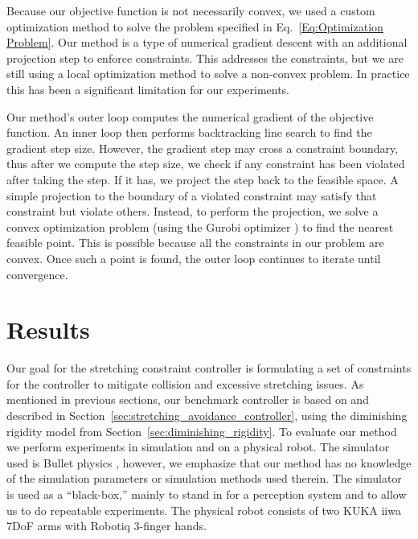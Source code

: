 Because our objective function is not necessarily convex, we used a custom optimization method to solve the problem specified in Eq.~\ref{Eq:Optimization Problem}. Our method is a type of numerical gradient descent with an additional projection step to enforce constraints. This addresses the constraints, but we are still using a local optimization method to solve a non-convex problem. In practice this has been a significant limitation for our experiments.

Our method's outer loop computes the numerical gradient of the objective function. An inner loop then performs backtracking line search to find the gradient step size. However, the gradient step may cross a constraint boundary, thus after we compute the step size, we check if any constraint has been violated after taking the step. If it has, we project the step back to the feasible space. A simple projection to the boundary of a violated constraint may satisfy that constraint but violate others. Instead, to perform the projection, we solve a convex optimization problem (using the Gurobi optimizer \cite{Gurobi2016}) to find the nearest feasible point. This is possible because all the constraints in our problem are convex. Once such a point is found, the outer loop continues to iterate until convergence.


\section{Results}
\label{sec:stretching_constraint_controller_results}

Our goal for the stretching constraint controller is formulating a set of constraints for the controller to mitigate collision and excessive stretching issues. As mentioned in previous sections, our benchmark controller is based on \cite{Berenson2013} and described in Section~\ref{sec:stretching_avoidance_controller}, using the diminishing rigidity model from Section~\ref{sec:diminishing_rigidity}. To evaluate our method we perform experiments in simulation and on a physical robot. The simulator used is Bullet physics \cite{Coumans2010}, however, we emphasize that our method has no knowledge of the simulation parameters or simulation methods used therein. The simulator is used as a ``black-box,'' mainly to stand in for a perception system and to allow us to do repeatable experiments. The physical robot consists of two KUKA iiwa 7DoF arms with Robotiq 3-finger hands.

